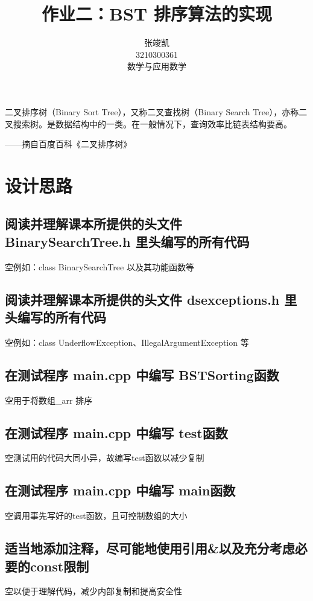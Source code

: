 \documentclass[UTF8]{ctexart}
\title{作业二：BST 排序算法的实现}
\author{张竣凯 \\ 3210300361 \\ 数学与应用数学}
\begin{document}
\maketitle

二叉排序树（Binary Sort Tree），又称二叉查找树（Binary Search Tree），亦称二叉搜索树。是数据结构中的一类。在一般情况下，查询效率比链表结构要高。

\begin{flushright}
——摘自百度百科《二叉排序树》
\end{flushright}

\section{设计思路}

\subsection{阅读并理解课本所提供的头文件 BinarySearchTree.h 里头编写的所有代码}
\hphantom 空例如：class BinarySearchTree 以及其功能函数等

\subsection{阅读并理解课本所提供的头文件 dsexceptions.h 里头编写的所有代码}
\hphantom 空例如：class UnderflowException、IllegalArgumentException 等

\subsection{在测试程序 main.cpp 中编写 BSTSorting函数}
\hphantom 空用于将数组\_arr 排序

\subsection{在测试程序 main.cpp 中编写 test函数}
\hphantom 空测试用的代码大同小异，故编写test函数以减少复制

\subsection{在测试程序 main.cpp 中编写 main函数}
\hphantom 空调用事先写好的test函数，且可控制数组的大小

\subsection{适当地添加注释，尽可能地使用引用\&以及充分考虑必要的const限制}
\hphantom 空以便于理解代码，减少内部复制和提高安全性
\end{document}
